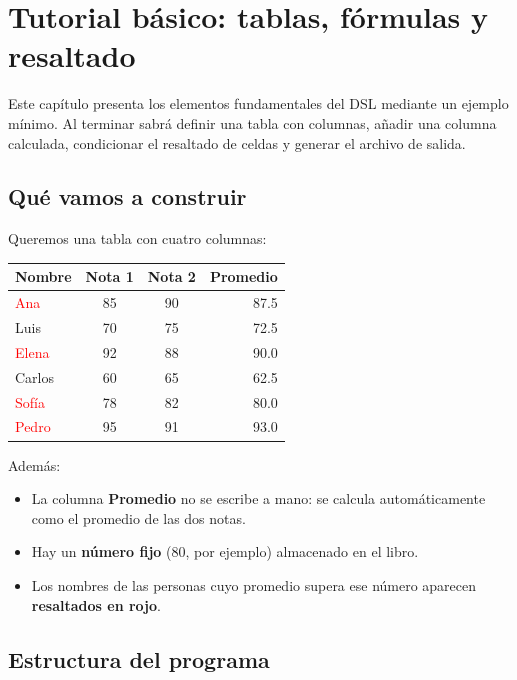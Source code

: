 \documentclass[12pt,a4paper]{report}
\begin{document}
\chapter{Tutorial básico: tablas, fórmulas y resaltado}
\label{cap:tutorial-basico}

Este capítulo presenta los elementos fundamentales del DSL mediante un
ejemplo mínimo.  Al terminar sabrá definir una tabla con columnas, añadir
una columna calculada, condicionar el resaltado de celdas y generar el
archivo de salida.

\section{Qué vamos a construir}

Queremos una tabla con cuatro columnas:



\begin{center}
\begin{tabular}{|l|c|c|r|}
\toprule
\textbf{Nombre} & \textbf{Nota 1} & \textbf{Nota 2} & \textbf{Promedio} \\
\midrule
\textcolor{red}{Ana}    & 85 & 90 & 87.5 \\
Luis   & 70 & 75 & 72.5 \\
\textcolor{red}{Elena}  & 92 & 88 & 90.0 \\
Carlos & 60 & 65 & 62.5 \\
\textcolor{red}{Sofía}  & 78 & 82 & 80.0 \\
\textcolor{red}{Pedro}  & 95 & 91 & 93.0 \\
\bottomrule
\end{tabular}
\end{center}

Además:
\begin{itemize}
  \item La columna \textbf{Promedio} no se escribe a mano: se calcula
    automáticamente como el promedio de las dos notas.
  \item Hay un \textbf{número fijo} (80, por ejemplo) almacenado en el
    libro.
  \item Los nombres de las personas cuyo promedio supera ese número
    aparecen \textbf{resaltados en rojo}.
\end{itemize}

\section{Estructura del programa}
\end{document}
